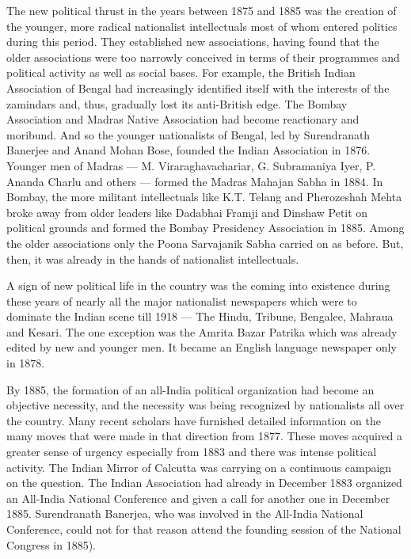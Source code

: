 The new political thrust in the years between 1875 and 1885 was the creation of the younger, more radical nationalist intellectuals most of whom entered politics during this period. They established new associations, having found that the older associations were too narrowly conceived in terms of their programmes and political activity as well as social bases. For example, the British Indian Association of Bengal had increasingly identified itself with the interests of the zamindars and, thus, gradually lost its anti-British edge. The Bombay Association and Madras Native Association had become reactionary and moribund. And so the younger nationalists of Bengal, led by Surendranath Banerjee and Anand Mohan Bose, founded the Indian Association in 1876. Younger men of Madras --- M. Viraraghavachariar, G. Subramaniya Iyer, P. Ananda Charlu and others --- formed the Madras Mahajan Sabha in 1884. In Bombay, the more militant intellectuals like K.T. Telang and Pherozeshah Mehta broke away from older leaders like Dadabhai Framji and Dinshaw Petit on political grounds and formed the Bombay Presidency Association in 1885. Among the older associations only the Poona Sarvajanik Sabha carried on as before. But, then, it was already in the hands of nationalist intellectuals.

A sign of new political life in the country was the coming into existence during these years of nearly all the major nationalist newspapers which were to dominate the Indian scene till 1918 --- The Hindu, Tribune, Bengalee, Mahraua and Kesari. The one exception was the Amrita Bazar Patrika which was already edited by new and younger men. It became an English language newspaper only in 1878.

By 1885, the formation of an all-India political organization had become an objective necessity, and the necessity was being recognized by nationalists all over the country. Many recent scholars have furnished detailed information on the many moves that were made in that direction from 1877. These moves acquired a greater sense of urgency especially from 1883 and there was intense political activity. The Indian Mirror of Calcutta was carrying on a continuous campaign on the question. The Indian Association had already in December 1883 organized an All-India National Conference and given a call for another one in December 1885. Surendranath Banerjea, who was involved in the All-India National Conference, could not for that reason attend the founding session of the National Congress in 1885).

